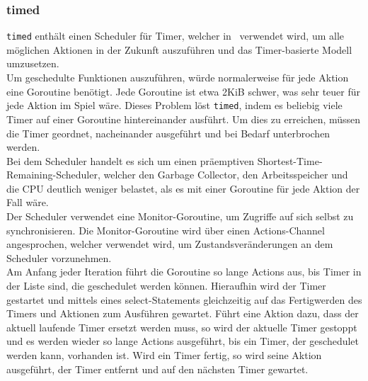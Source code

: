 \subsubsection{timed}
\verb+timed+ enthält einen Scheduler für Timer, welcher in \vires\ verwendet wird, um alle möglichen Aktionen in der Zukunft auszuführen und das Timer-basierte Modell umzusetzen. \\
Um geschedulte Funktionen auszuführen, würde normalerweise für jede Aktion eine Goroutine benötigt. Jede Goroutine ist etwa 2KiB schwer, was sehr teuer für jede Aktion im Spiel wäre. Dieses Problem löst \verb+timed+, indem es beliebig viele Timer auf einer Goroutine hintereinander ausführt. Um dies zu erreichen, müssen die Timer geordnet, nacheinander ausgeführt und bei Bedarf unterbrochen werden. \\
Bei dem Scheduler handelt es sich um einen präemptiven Shortest-Time-Remaining-Scheduler, welcher den Garbage Collector, den Arbeitsspeicher und die CPU deutlich weniger belastet, als es mit einer Goroutine für jede Aktion der Fall wäre. \\
Der Scheduler verwendet eine Monitor-Goroutine, um Zugriffe auf sich selbst zu synchronisieren. Die Monitor-Goroutine wird über einen Actions-Channel angesprochen, welcher verwendet wird, um Zustandsveränderungen an dem Scheduler vorzunehmen. \\
Am Anfang jeder Iteration führt die Goroutine so lange Actions aus, bis Timer in der Liste sind, die geschedulet werden können. Hieraufhin wird der Timer gestartet und mittels eines select-Statements gleichzeitig auf das Fertigwerden des Timers und Aktionen zum Ausführen gewartet. Führt eine Aktion dazu, dass der aktuell laufende Timer ersetzt werden muss, so wird der aktuelle Timer gestoppt und es werden wieder so lange Actions ausgeführt, bis ein Timer, der geschedulet werden kann, vorhanden ist. Wird ein Timer fertig, so wird seine Aktion ausgeführt, der Timer entfernt und auf den nächsten Timer gewartet.

